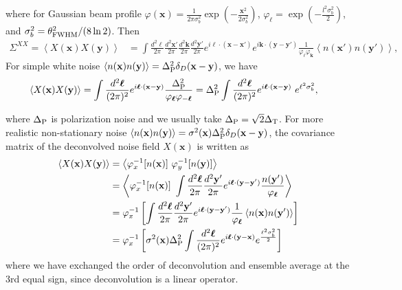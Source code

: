 \documentclass[aps, prd, reprint, nofootinbib, groupedaddress, showpacs]{revtex4-1}
\def\be{\begin{equation}}
\def\ee{\end{equation}}
\newcommand*\Bell{\ensuremath{\boldsymbol\ell}}
\begin{document}
\begin{widetext}
where for Gaussian beam profile
$\varphi(\mathbf x) = \frac{1}{2\pi\sigma_b^2} \exp\left(-\frac{\mathbf x^2}{2\sigma_b^2}\right)$,
$\varphi_{\Bell} = \exp \left(-\frac{l^2 \sigma_b^2}{2} \right)$, and $\sigma_b^2 = \theta^2_{\rm FWHM}/(8 \ln 2)$.
Then
\begin{align}
    \Sigma^{XX} = \left< X(\mathbf x) X(\mathbf y)\right>
    &= \int \frac{d^2\Bell}{2\pi}
    \frac{d^2\mathbf x'}{2\pi} \frac{d^2\mathbf k}{2\pi} \frac{d^2\mathbf y'}{2\pi}
    e^{i\Bell\cdot (\mathbf x- \mathbf x')}
     e^{i\mathbf k\cdot (\mathbf y- \mathbf y')}  \frac{1}{ \varphi_{\Bell}\varphi_{\mathbf k} }
    \left<n(\mathbf x') n(\mathbf y') \right>,
\end{align}
For simple white noise
$\left< n(\mathbf x) n(\mathbf y)\right> =\Delta_{\rm P}^2 \delta_D(\mathbf x-\mathbf y)$, we have
\begin{align}
    \left< X(\mathbf x) X(\mathbf y)\right>
    &= \int \frac{d^2\Bell}{(2\pi)^2}
    e^{i\Bell\cdot (\mathbf x -\mathbf y)}
    \frac{\Delta_{\rm P}^2 }{ \varphi_{\Bell} \varphi_{-\Bell} }
    = \Delta_{\rm P}^2 \int \frac{d^2\Bell}{(2\pi)^2}
    e^{i\Bell\cdot (\mathbf x -\mathbf y)}\ e^{\ell^2\sigma_b^2},
\end{align}

where
$\Delta_{\rm P}$ is polarization noise and we usually take $\Delta_{\rm P} = \sqrt{2} \Delta_{\rm T}$.
For more realistic non-stationary noise $\left< n(\mathbf x) n(\mathbf y)\right>
= \sigma^2(\mathbf x)\Delta_{\rm P}^2 \delta_D(\mathbf x-\mathbf y)$,
the covariance matrix of the deconvolved noise field $X(\mathbf x)$ is written as
\be
\begin{aligned}
    \left< X(\mathbf x) X(\mathbf y)\right>
    &= \left<\varphi_x^{-1}[n(\mathbf x)]  \ \varphi_y^{-1}[n(\mathbf y)]\right> \\
    &= \left<\varphi_x^{-1}[n(\mathbf x)]  \ \int \frac{d^2\Bell}{2\pi} \frac{d^2\mathbf y'}{2\pi}
    e^{i\Bell\cdot (\mathbf y- \mathbf y')}  \frac{n(\mathbf y')}{\varphi_{\Bell}} \right>\\
    &= \varphi_x^{-1} \left[  \int \frac{d^2\Bell}{2\pi} \frac{d^2\mathbf y'}{2\pi}
    e^{i\Bell\cdot (\mathbf y- \mathbf y')}  \frac{1}{\varphi_{\Bell}} \left<n(\mathbf x)n(\mathbf y') \right> \right] \\
    &=\varphi_x^{-1} \left[ \sigma^2(\mathbf x) \Delta_{\rm P}^2  \int \frac{d^2\Bell}{(2\pi)^2}
    e^{i\Bell\cdot (\mathbf y- \mathbf x)}  e^{\frac{\ell^2\sigma_b^2}{2}} \right]
\end{aligned}
\ee
where we have exchanged the order of deconvolution and ensemble average at the 3rd equal sign,
since deconvolution is a linear operator.


\end{widetext}
\end{document}
